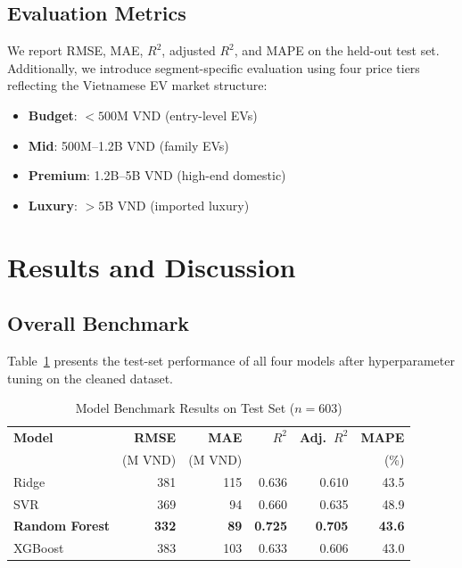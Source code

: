 \documentclass[lettersize,journal]{IEEEtran}
\begin{document}
\subsection{Evaluation Metrics}
We report RMSE, MAE, $R^2$, adjusted $R^2$, and MAPE on the held-out test
set. Additionally, we introduce segment-specific evaluation using four price
tiers reflecting the Vietnamese EV market structure:
\begin{itemize}
    \item \textbf{Budget}: $< 500$M VND (entry-level EVs)
    \item \textbf{Mid}: 500M--1.2B VND (family EVs)
    \item \textbf{Premium}: 1.2B--5B VND (high-end domestic)
    \item \textbf{Luxury}: $> 5$B VND (imported luxury)
\end{itemize}

\section{Results and Discussion}

\subsection{Overall Benchmark}
Table~\ref{tab:benchmark} presents the test-set performance of all four
models after hyperparameter tuning on the cleaned dataset.

\begin{table}[!t]
\caption{Model Benchmark Results on Test Set ($n = 603$)\label{tab:benchmark}}
\centering
\begin{tabular}{lrrrrr}
\toprule
\textbf{Model} & \textbf{RMSE} & \textbf{MAE} & \textbf{$R^2$} & \textbf{Adj.\ $R^2$} & \textbf{MAPE} \\
 & (M VND) & (M VND) & & & (\%) \\
\midrule
Ridge & 381 & 115 & 0.636 & 0.610 & 43.5 \\
SVR & 369 & 94 & 0.660 & 0.635 & 48.9 \\
\textbf{Random Forest} & \textbf{332} & \textbf{89} & \textbf{0.725} & \textbf{0.705} & \textbf{43.6} \\
XGBoost & 383 & 103 & 0.633 & 0.606 & 43.0 \\
\bottomrule
\end{tabular}
\end{table}
\end{document}
